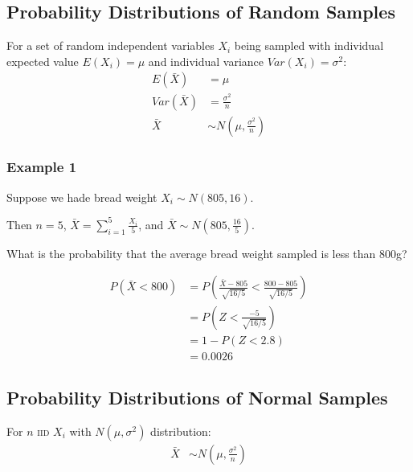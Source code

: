                 \subsection{Probability Distributions of Random Samples} %
                \label{sub:probability_distributions_of_random_samples}
                    For a set of random independent variables $X_i$ being sampled with individual expected value $E(X_i) = \mu$ and individual variance $Var(X_i) = \sigma^2$:
                    \begin{align*}
                        E(\bar{X}) &= \mu \\
                        Var(\bar{X}) &= \frac{\sigma^2}{n} \\
                        \bar{X} &\sim N(\mu, \frac{\sigma^2}{n})
                    \end{align*}

                    \subsubsection{Example 1} %
                    \label{ssub:example_1}
                        Suppose we hade bread weight $X_i \sim N(805, 16)$.

                        Then $n = 5$, $\bar{X} = \sum_{i=1}^5 \frac{X_i}{5}$, and $\bar{X} \sim N(805, \frac{16}{5})$.

                        What is the probability that the average bread weight sampled is less than 800g?

                        \begin{align*}
                            P(\bar{X} < 800) &= P(\frac{\bar{X} - 805}{\sqrt{16/5}} < \frac{800 - 805}{\sqrt{16/5}}) \\
                            &= P(Z < \frac{-5}{\sqrt{16/5}}) \\
                            &= 1 - P(Z < 2.8) \\
                            &= 0.0026
                        \end{align*}
                \subsection{Probability Distributions of Normal Samples} %
                \label{sub:probability_distributions_of_normal_samples}
                    For $n$ \textsc{iid} $X_i$ with $N(\mu, \sigma^2)$ distribution:
                    \begin{align*}
                        \bar{X} &\sim N \left(\mu, \frac{\sigma^2}{n} \right)
                    \end{align*}
